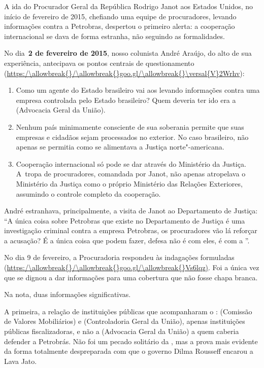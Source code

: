 A ida do Procurador Geral da República Rodrigo Janot aos Estados Unidos,
no início de fevereiro de 2015, chefiando uma equipe de procuradores,
levando informações contra a Petrobras, despertou o primeiro alerta: a
cooperação internacional se dava de forma estranha, não seguindo as
formalidades.

No dia~\textbf{2 de fevereiro de 2015}, nosso colunista André Araújo, do
alto de sua experiência, antecipava os pontos centrais de questionamento
(\url{https:/\allowbreak{}/\allowbreak{}goo.gl/\allowbreak{}\versal{V}2Wrhv}):

\begin{enumerate}
\itemsep1pt\parskip0pt
\item
  Como um agente do Estado brasileiro vai aos  levando informações
  contra uma empresa controlada pelo Estado brasileiro? Quem deveria ter
  ido era a  (Advocacia Geral da União).
\item
  Nenhum país minimamente consciente de sua soberania permite que suas
  empresas e cidadãos sejam processados no exterior. No caso brasileiro,
  não apenas se permitia como se alimentava a Justiça norte"-americana.
\item
  Cooperação internacional só pode se dar através do Ministério da
  Justiça. A~tropa de procuradores, comandada por Janot, não apenas
  atropelava o Ministério da Justiça como o próprio Ministério das
  Relações Exteriores, assumindo o controle completo da cooperação.
\end{enumerate}

André estranhava, principalmente, a visita de Janot ao Departamento de
Justiça: ``A única coisa sobre Petrobras que existe no Departamento de
Justiça é uma investigação criminal contra a empresa Petrobras, os
procuradores vão lá reforçar a acusação? É a única coisa que podem
fazer, defesa não é com eles, é com a ''.

No dia 9 de fevereiro, a Procuradoria respondeu às indagações formuladas
(\url{https:/\allowbreak{}/\allowbreak{}goo.gl/\allowbreak{}Vs6lqz)}. Foi a única vez que se dignou a dar
informações para uma cobertura que não fosse chapa branca.

Na nota, duas informações significativas.

A primeira, a relação de instituições públicas que acompanharam o :
 (Comissão de Valores Mobiliários) e  (Controladoria Geral da
União), apenas instituições públicas fiscalizadoras, e não a 
(Advocacia Geral da União) a quem caberia defender a Petrobrás. Não foi
um pecado solitário da , mas a prova mais evidente da forma
totalmente despreparada com que o governo Dilma Rousseff encarou a Lava
Jato.

